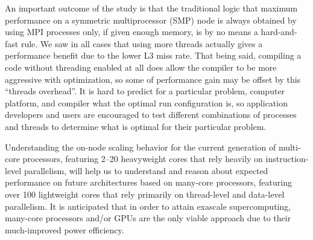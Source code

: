 \documentclass{mc2015}
\begin{document}
An important outcome of the study is that the traditional logic that maximum
performance on a symmetric multiprocessor (SMP) node is always obtained by using
MPI processes only, if given enough memory, is by no means a hard-and-fast
rule. We saw in all cases that using more threads actually gives a performance
benefit due to the lower L3 miss rate. That being said, compiling a code without
threading enabled at all does allow the compiler to be more aggressive with
optimization, so some of performance gain may be offset by this ``threads
overhead''. It is hard to predict for a particular problem, computer platform,
and compiler what the optimal run configuration is, so application developers
and users are encouraged to test different combinations of processes and threads
to determine what is optimal for their particular problem.

Understanding the on-node scaling behavior for the current generation of
multi-core processors, featuring 2--20 heavyweight cores that rely heavily on
instruction-level parallelism, will help us to understand and reason about
expected performance on future architectures based on many-core processors,
featuring over 100 lightweight cores that rely primarily on thread-level and
data-level parallelism. It is anticipated that in order to attain exascale
supercomputing, many-core processors and/or GPUs are the only viable approach
due to their much-improved power efficiency.


\setlength{\baselineskip}{12pt}



\end{document}
